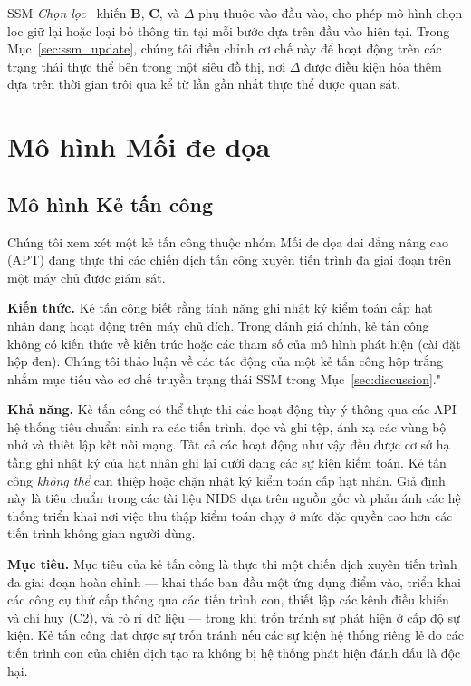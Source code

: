 \documentclass[letterpaper,twocolumn,10pt]{article}
\begin{document}
SSM \emph{Chọn lọc}~\cite{gu2024mamba} khiến $\mathbf{B}$, $\mathbf{C}$, và $\Delta$ phụ thuộc vào đầu vào, cho phép mô hình chọn lọc giữ lại hoặc loại bỏ thông tin tại mỗi bước dựa trên đầu vào hiện tại. Trong Mục~\ref{sec:ssm_update}, chúng tôi điều chỉnh cơ chế này để hoạt động trên các trạng thái thực thể bên trong một siêu đồ thị, nơi $\Delta$ được điều kiện hóa thêm dựa trên thời gian trôi qua kể từ lần gần nhất thực thể được quan sát.

\section{Mô hình Mối đe dọa}
\label{sec:threat_model}

\subsection{Mô hình Kẻ tấn công}
\label{sec:attacker_model}

Chúng tôi xem xét một kẻ tấn công thuộc nhóm Mối đe dọa dai dẳng nâng cao (APT) đang thực thi các chiến dịch tấn công xuyên tiến trình đa giai đoạn trên một máy chủ được giám sát.

\textbf{Kiến thức.} Kẻ tấn công biết rằng tính năng ghi nhật ký kiểm toán cấp hạt nhân đang hoạt động trên máy chủ đích. Trong đánh giá chính, kẻ tấn công không có kiến thức về kiến trúc hoặc các tham số của mô hình phát hiện (cài đặt hộp đen). Chúng tôi thảo luận về các tác động của một kẻ tấn công hộp trắng nhắm mục tiêu vào cơ chế truyền trạng thái SSM trong Mục~\ref{sec:discussion}."

\textbf{Khả năng.} Kẻ tấn công có thể thực thi các hoạt động tùy ý thông qua các API hệ thống tiêu chuẩn: sinh ra các tiến trình, đọc và ghi tệp, ánh xạ các vùng bộ nhớ và thiết lập kết nối mạng. Tất cả các hoạt động như vậy đều được cơ sở hạ tầng ghi nhật ký của hạt nhân ghi lại dưới dạng các sự kiện kiểm toán. Kẻ tấn công \emph{không thể} can thiệp hoặc chặn nhật ký kiểm toán cấp hạt nhân. Giả định này là tiêu chuẩn trong các tài liệu NIDS dựa trên nguồn gốc và phản ánh các hệ thống triển khai nơi việc thu thập kiểm toán chạy ở mức đặc quyền cao hơn các tiến trình không gian người dùng.

\textbf{Mục tiêu.} Mục tiêu của kẻ tấn công là thực thi một chiến dịch xuyên tiến trình đa giai đoạn hoàn chỉnh --- khai thác ban đầu một ứng dụng điểm vào, triển khai các công cụ thứ cấp thông qua các tiến trình con, thiết lập các kênh điều khiển và chỉ huy (C2), và rò rỉ dữ liệu --- trong khi trốn tránh sự phát hiện ở cấp độ sự kiện. Kẻ tấn công đạt được sự trốn tránh nếu các sự kiện hệ thống riêng lẻ do các tiến trình con của chiến dịch tạo ra không bị hệ thống phát hiện đánh dấu là độc hại.
\end{document}
